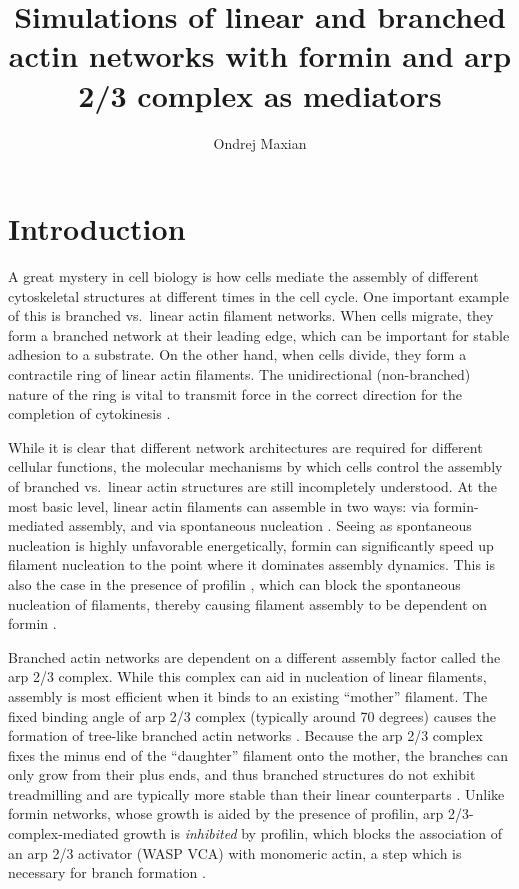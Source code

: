 \documentclass[11pt]{article}
\title{Simulations of linear and branched actin networks with formin and arp 2/3 complex as mediators  \vspace{-0.5 cm}}
\author{Ondrej Maxian  \vspace{-0.75 cm}}
\begin{document}
\maketitle

\section{Introduction} 
A great mystery in cell biology is how cells mediate the assembly of different cytoskeletal structures at different times in the cell cycle. One important example of this is branched vs.\ linear actin filament networks. When cells migrate, they form a branched network at their leading edge, which can be important for stable adhesion to a substrate. On the other hand, when cells divide, they form a contractile ring of linear actin filaments. The unidirectional (non-branched) nature of the ring is vital to transmit force in the correct direction for the completion of cytokinesis \cite{alberts}. 

While it is clear that different network architectures are required for different cellular functions, the molecular mechanisms by which cells control the assembly of branched vs.\ linear actin structures are still incompletely understood. At the most basic level, linear actin filaments can assemble in two ways: via formin-mediated assembly, and via spontaneous nucleation \cite{alberts, pollard2007regulation}. Seeing as spontaneous nucleation is highly unfavorable energetically, formin can significantly speed up filament nucleation \cite{rosenbloom2021mechanism} to the point where it dominates assembly dynamics. This is also the case in the presence of profilin \cite{schutt1993structure}, which can block the spontaneous nucleation of filaments, thereby causing filament assembly to be dependent on formin \cite{alberts, pollard1984quantitative}. 

Branched actin networks are dependent on a different assembly factor called the arp 2/3 complex. While this complex can aid in nucleation of linear filaments, assembly is most efficient when it binds to an existing ``mother'' filament. The fixed binding angle of arp 2/3 complex (typically around 70 degrees) causes the formation of tree-like branched actin networks \cite{pollard2007regulation, alberts}. Because the arp 2/3 complex fixes the minus end of the ``daughter'' filament onto the mother, the branches can only grow from their plus ends, and thus branched structures do not exhibit treadmilling and are typically more stable than their linear counterparts \cite{alberts, ni2019turnover, liman2020role}. Unlike formin networks, whose growth is aided by the presence of profilin, arp 2/3-complex-mediated growth is \emph{inhibited} by profilin, which blocks the association of an arp 2/3 activator (WASP VCA) with monomeric actin, a step which is necessary for branch formation \cite{suarez2015profilin}. 
\end{document}
